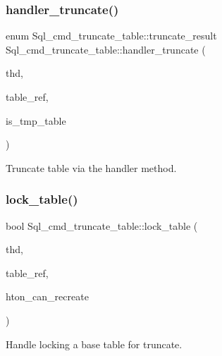 \subsubsection{\texorpdfstring{handler\+\_\+truncate()}{handler\_truncate()}}
{\footnotesize\ttfamily enum Sql\+\_\+cmd\+\_\+truncate\+\_\+table\+::truncate\+\_\+result Sql\+\_\+cmd\+\_\+truncate\+\_\+table\+::handler\+\_\+truncate (\begin{DoxyParamCaption}\item[{T\+HD $\ast$}]{thd,  }\item[{\mbox{\hyperlink{structTABLE__LIST}{T\+A\+B\+L\+E\+\_\+\+L\+I\+ST}} $\ast$}]{table\+\_\+ref,  }\item[{bool}]{is\+\_\+tmp\+\_\+table }\end{DoxyParamCaption})\hspace{0.3cm}{\ttfamily [protected]}}

Truncate table via the handler method. \mbox{\label{classSql__cmd__truncate__table_a36988cde3d2fc5b7314c7b42ba62e636}} 
\subsubsection{\texorpdfstring{lock\+\_\+table()}{lock\_table()}}
{\footnotesize\ttfamily bool Sql\+\_\+cmd\+\_\+truncate\+\_\+table\+::lock\+\_\+table (\begin{DoxyParamCaption}\item[{T\+HD $\ast$}]{thd,  }\item[{\mbox{\hyperlink{structTABLE__LIST}{T\+A\+B\+L\+E\+\_\+\+L\+I\+ST}} $\ast$}]{table\+\_\+ref,  }\item[{bool $\ast$}]{hton\+\_\+can\+\_\+recreate }\end{DoxyParamCaption})\hspace{0.3cm}{\ttfamily [protected]}}

Handle locking a base table for truncate. \mbox{\label{classSql__cmd__truncate__table_a330e8a3864e8646a4ac4053c8a93db6d}} 
